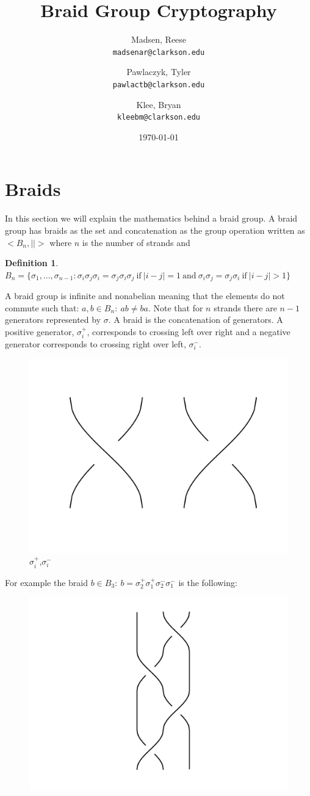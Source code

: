 \documentclass{article}
\title{Braid Group Cryptography}
\author{
  Madsen, Reese\\
  \texttt{madsenar@clarkson.edu}
  \and
  Pawlaczyk, Tyler\\
  \texttt{pawlactb@clarkson.edu}
   \and
  Klee, Bryan\\
  \texttt{kleebm@clarkson.edu}
}
\date{\today}
\theoremstyle{definition}
\newtheorem{definition}{Definition}[section]
\begin{document}
	\maketitle
	
	
	
	\section{Braids}
	In this section we will explain the mathematics behind a braid group. A braid group has braids as the set and concatenation as the group operation written as $<B_n,||>$ where $n$ is the number of strands and 

\begin{definition} 
$B_n=\{\sigma_1,...,\sigma_{n-1}:\sigma_i\sigma_j\sigma_i=\sigma_j\sigma_i\sigma_j\ \textrm{if}\ |i-j|=1\ \textrm{and}\ \sigma_i\sigma_j=\sigma_j\sigma_i\ \textrm{if}\ |i-j|>1\}$
\end{definition}
 
A braid group is infinite and nonabelian meaning that the elements do not commute such that:
$a,b \in B_n: \ ab\neq ba$. Note that for $n$ strands there are $n-1$ generators represented by $\sigma$. A braid is the concatenation of generators. A positive generator, $\sigma_i^+$, corresponds to crossing left over right and a negative generator corresponds to crossing right over left, $\sigma_i^-$. 

\begin{figure}[hbp!]
\centering
  \includegraphics[width=0.2\linewidth]{./Pictures/gen_pos_neg.png}
  \caption{$\sigma_i^+$,$\sigma_i^-$}\label{fig:graph}
\end{figure}


For example the braid $b \in B_3: \ b=\sigma_2^+ \sigma_1^+ \sigma_2^- \sigma_1^-$ is the following:
	
	\begin{figure}[hbp!]
\centering
  \includegraphics[width=0.2\linewidth]{./Pictures/example_braid.png}
\end{figure}
	
\end{document}
